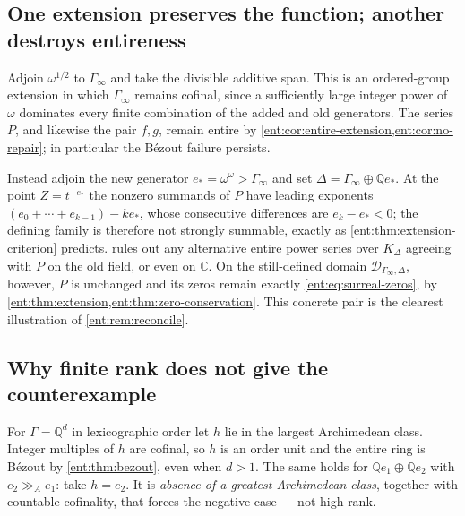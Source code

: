 \documentclass[11pt]{article}
\theoremstyle{plain}
\theoremstyle{plain}
\theoremstyle{plain}
\theoremstyle{definition}
\theoremstyle{definition}
\theoremstyle{definition}
\theoremstyle{definition}
\theoremstyle{remark}
\newcommand{\C}{\mathbb C}\newcommand{\R}{\mathbb R}
\newcommand{\Q}{\mathbb Q}\newcommand{\Z}{\mathbb Z}\newcommand{\N}{\mathbb N}
\newcommand{\ggA}{\mathrel{\gg_{\!A}}}
\begin{document}
\subsection{One extension preserves the function; another destroys entireness}
\label{ent:subsec:two-extensions}
Adjoin $\omega^{1/2}$ to $\Gamma_\infty$ and take the divisible additive span.
This is an ordered-group extension in which $\Gamma_\infty$ remains cofinal,
since a sufficiently large integer power of $\omega$ dominates every finite
combination of the added and old generators. The series $P$, and likewise the
pair $f,g$, remain entire by
\cref{ent:cor:entire-extension,ent:cor:no-repair}; in particular the B\'ezout
failure persists.

Instead adjoin the new generator $e_*=\omega^\omega>\Gamma_\infty$ and set
$\Delta=\Gamma_\infty\oplus\Q e_*$. At the point $Z=t^{-e_*}$ the nonzero
summands of $P$ have leading exponents
$(e_0+\cdots+e_{k-1})-ke_*$, whose consecutive differences are
$e_k-e_*<0$; the defining family is therefore not strongly summable, exactly
as \cref{ent:thm:extension-criterion} predicts.
 rules out any alternative entire power series
over $K_\Delta$ agreeing with $P$ on the old field, or even on $\C$. On the
still-defined domain $\mathcal D_{\Gamma_\infty,\Delta}$, however, $P$ is
unchanged and its zeros remain exactly \eqref{ent:eq:surreal-zeros}, by
\cref{ent:thm:extension,ent:thm:zero-conservation}. This concrete pair is the
clearest illustration of \cref{ent:rem:reconcile}.

\subsection{Why finite rank does not give the counterexample}
\label{ent:subsec:finite-rank}
For $\Gamma=\Q^d$ in lexicographic order let $h$ lie in the largest
Archimedean class. Integer multiples of $h$ are cofinal, so $h$ is an order
unit and the entire ring is B\'ezout by \cref{ent:thm:bezout}, even when
$d>1$. The same holds for $\Q e_1\oplus\Q e_2$ with $e_2\ggA e_1$: take
$h=e_2$. It is \emph{absence of a greatest Archimedean class}, together with
countable cofinality, that forces the negative case --- not high rank.
\end{document}
